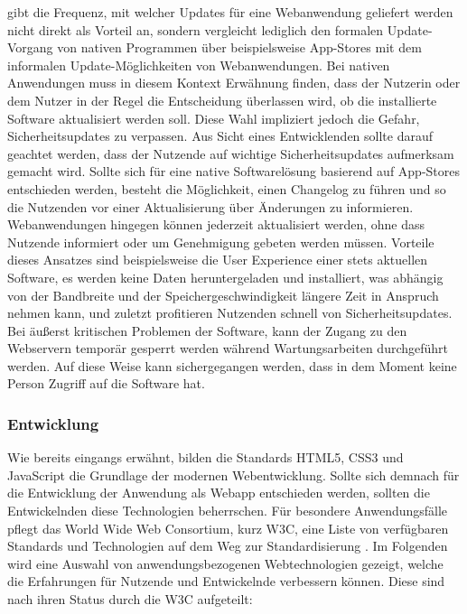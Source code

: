 \documentclass[a4paper]{scrartcl}
\begin{document}
\textcite[28]{Jobe} gibt die Frequenz, mit welcher Updates für eine Webanwendung geliefert werden nicht direkt als Vorteil an, sondern vergleicht lediglich den formalen Update-Vorgang von nativen Programmen über beispielsweise App-Stores mit dem informalen Update-Möglichkeiten von Webanwendungen. Bei nativen Anwendungen muss in diesem Kontext Erwähnung finden, dass der Nutzerin oder dem Nutzer in der Regel die Entscheidung überlassen wird, ob die installierte Software aktualisiert werden soll. Diese Wahl impliziert jedoch die Gefahr, Sicherheitsupdates zu verpassen. Aus Sicht eines Entwicklenden sollte darauf geachtet werden, dass der Nutzende auf wichtige Sicherheitsupdates aufmerksam gemacht wird. Sollte sich für eine native Softwarelösung basierend auf App-Stores entschieden werden, besteht die Möglichkeit, einen Changelog zu führen und so die Nutzenden vor einer Aktualisierung über Änderungen zu informieren. \\
Webanwendungen hingegen können jederzeit aktualisiert werden, ohne dass Nutzende informiert oder um Genehmigung gebeten werden müssen. Vorteile dieses Ansatzes sind beispielsweise die User Experience einer stets aktuellen Software, es werden keine Daten heruntergeladen und installiert, was abhängig von der Bandbreite und der Speichergeschwindigkeit längere Zeit in Anspruch nehmen kann, und zuletzt profitieren Nutzenden schnell von Sicherheitsupdates. Bei äußerst kritischen Problemen der Software, kann der Zugang zu den Webservern temporär gesperrt werden während Wartungsarbeiten durchgeführt werden. Auf diese Weise kann sichergegangen werden, dass in dem Moment keine Person Zugriff auf die Software hat.

\subsubsection{Entwicklung}

Wie bereits eingangs erwähnt, bilden die Standards HTML5, CSS3 und JavaScript die Grundlage der modernen Webentwicklung. Sollte sich demnach für die Entwicklung der Anwendung als Webapp entschieden werden, sollten die Entwickelnden diese Technologien beherrschen. Für besondere Anwendungsfälle pflegt das World Wide Web Consortium, kurz W3C, eine Liste von verfügbaren Standards und Technologien auf dem Weg zur Standardisierung \autocite{W3C}. Im Folgenden wird eine Auswahl von anwendungsbezogenen Webtechnologien gezeigt, welche die Erfahrungen für Nutzende und Entwickelnde verbessern können. Diese sind nach ihren Status durch die W3C aufgeteilt:
\end{document}
